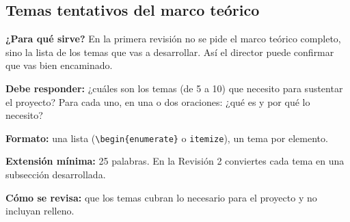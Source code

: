

\subsection{Temas tentativos del marco teórico} \label{sec:temas_tentativos} %

\begin{guia}
\textbf{¿Para qué sirve?} En la primera revisión no se pide el marco teórico completo, sino la lista de los temas que
vas a desarrollar. Así el director puede confirmar que vas bien encaminado.

\textbf{Debe responder:} ¿cuáles son los temas (de 5 a 10) que necesito para sustentar el proyecto? Para cada uno, en una
o dos oraciones: ¿qué es y por qué lo necesito?

\textbf{Formato:} una lista (\verb|\begin{enumerate}| o \verb|itemize|), un tema por elemento.

\textbf{Extensión mínima:} 25 palabras. En la Revisión 2 conviertes cada tema en una subsección desarrollada.

\textbf{Cómo se revisa:} que los temas cubran lo necesario para el proyecto y no incluyan relleno.
\end{guia}

